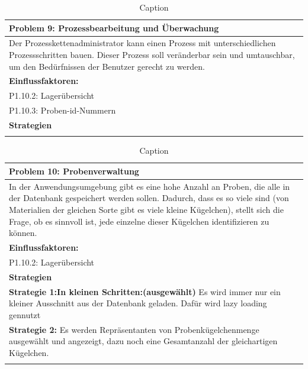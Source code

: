 \documentclass[enabledeprecatedfontcommands,fontsize=12pt,paper=a4,twoside]{scrartcl}
\begin{document}
\begin{table}[H]
    \centering
    \begin{tabular}{|p{15cm}|}
    \hline
          \textbf{Problem 9:} Prozessbearbeitung und Überwachung
          \\ \hline
          Der Prozesskettenadministrator kann einen Prozess mit unterschiedlichen Prozessschritten bauen. Dieser Prozess soll veränderbar sein und umtauschbar, um den Bedürfnissen der Benutzer gerecht zu werden.

          \\ \hline
          \textbf{Einflussfaktoren: } \\
          P1.10.2: Lagerübersicht \\
	      P1.10.3: Proben-id-Nummern \\
          \hline
          \textbf{Strategien} \\ \hline
         
          \\ \hline
    \end{tabular}
    \caption{Caption}
    \label{tab:my_label}
\end{table}

\begin{table}[H]
    \centering
    \begin{tabular}{|p{15cm}|}
    \hline
          \textbf{Problem 10:} Probenverwaltung
          \\ \hline
         In der Anwendungsumgebung gibt es eine hohe Anzahl an Proben, die alle in der Datenbank gespeichert werden sollen. Dadurch, dass es so viele sind (von Materialien der gleichen Sorte gibt es viele kleine Kügelchen), stellt sich die Frage, ob es sinnvoll ist, jede einzelne dieser Kügelchen identifizieren zu können.
          \\ \hline
          \textbf{Einflussfaktoren: } \\
          P1.10.2: Lagerübersicht \\
          \hline
          \textbf{Strategien} \\ \hline
\textbf{Strategie 1:In kleinen Schritten:(ausgewählt)} Es wird immer nur ein kleiner Ausschnitt aus der Datenbank geladen. Dafür wird lazy loading gennutzt \\
         \textbf{Strategie 2:} Es werden Repräsentanten von Probenkügelchenmenge ausgewählt und angezeigt, dazu noch eine Gesamtanzahl der gleichartigen Kügelchen. \\
          \\ \hline
    \end{tabular}
    \caption{Caption}
    \label{tab:my_label}
\end{table}
\end{document}
